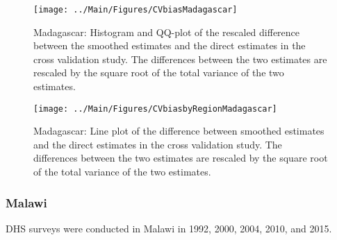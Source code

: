 \documentclass[12pt]{article}\usepackage[]{graphicx}\usepackage[]{color}
\newenvironment{knitrout}{}{} %
\begin{document}
\begin{knitrout}
\color{fgcolor}\begin{figure}[bht]

{\centering \texttt{[image: ../Main/Figures/CVbiasMadagascar]} 

}

\caption[Madagascar]{Madagascar: Histogram and QQ-plot of the rescaled difference between the smoothed estimates and the direct estimates in the cross validation study. The differences between the two estimates are rescaled by the square root of the total variance of the two estimates.}\label{fig:unnamed-chunk-199}
\end{figure}


\end{knitrout}

\begin{knitrout}
\color{fgcolor}\begin{figure}[bht]

{\centering \texttt{[image: ../Main/Figures/CVbiasbyRegionMadagascar]} 

}

\caption[Madagascar]{Madagascar: Line plot of the difference between smoothed estimates and the direct estimates in the cross validation study. The differences between the two estimates are rescaled by the square root of the total variance of the two estimates.}\label{fig:unnamed-chunk-200}
\end{figure}


\end{knitrout}


\clearpage
\subsubsection{Malawi}





DHS surveys were conducted in Malawi in 1992, 2000, 2004, 2010, and 2015.
\end{document}
